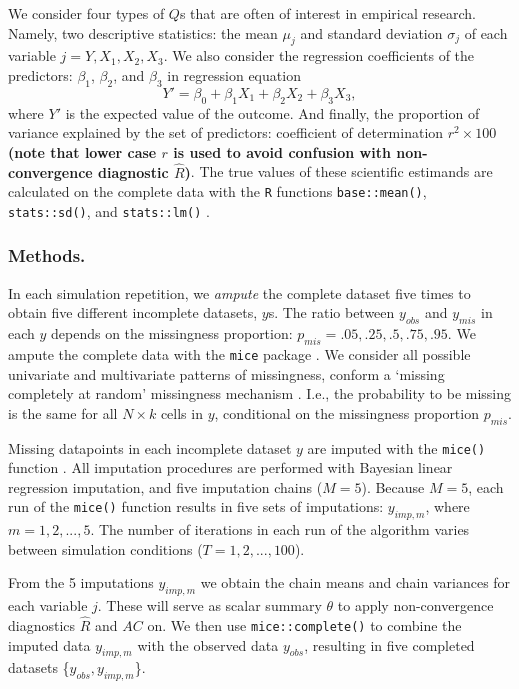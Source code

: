 \documentclass[Royal,times,sageh]{sagej}
\begin{document}
We consider four types of \(Q\)s that are often of interest in empirical research. Namely, two descriptive statistics: the mean \(\mu_j\) and standard deviation \(\sigma_j\) of each variable \(j = Y, X_1, X_2, X_3\). We also consider the regression coefficients of the predictors: \(\beta_1\), \(\beta_2\), and \(\beta_3\) in regression equation
\[Y' = \beta_0 + \beta_1 X_1 + \beta_2 X_2 + \beta_3 X_3,\]
where \(Y'\) is the expected value of the outcome. And finally, the proportion of variance explained by the set of predictors: coefficient of determination \(r^2 \times 100\) \textbf{(note that lower case \(r\) is used to avoid confusion with non-convergence diagnostic \(\widehat{R}\))}. The true values of these scientific estimands are calculated on the complete data with the \texttt{R} functions \texttt{base::mean()}, \texttt{stats::sd()}, and \texttt{stats::lm()} \citep{R}.

\hypertarget{methods.}{%
\subsubsection{Methods.}\label{methods.}}

In each simulation repetition, we \emph{ampute} the complete dataset five times to obtain five different incomplete datasets, \(y\)s. The ratio between \(y_{obs}\) and \(y_{mis}\) in each \(y\) depends on the missingness proportion: \(p_{mis} =.05,.25,.5,.75,.95\). We ampute the complete data with the \texttt{mice} package \citep[function \texttt{mice::ampute()};][]{mice}. We consider all possible univariate and multivariate patterns of missingness, conform a `missing completely at random' missingness mechanism \citep{rubin87}. I.e., the probability to be missing is the same for all \(N \times k\) cells in \(y\), conditional on the missingness proportion \(p_{mis}\).

Missing datapoints in each incomplete dataset \(y\) are imputed with the \texttt{mice()} function \citep{mice}. All imputation procedures are performed with Bayesian linear regression imputation, and five imputation chains (\(M=5\)). Because \(M=5\), each run of the \texttt{mice()} function results in five sets of imputations: \(y_{imp,m}\), where \(m = 1, 2, ..., 5\). The number of iterations in each run of the algorithm varies between simulation conditions (\(T=1,2,...,100\)).

From the 5 imputations \(y_{imp,m}\) we obtain the chain means and chain variances for each variable \(j\). These will serve as scalar summary \(\theta\) to apply non-convergence diagnostics \(\widehat{R}\) and \(AC\) on. We then use \texttt{mice::complete()} to combine the imputed data \(y_{imp,m}\) with the observed data \(y_{obs}\), resulting in five completed datasets \{\(y_{obs}, y_{imp, m}\)\}.
\end{document}
